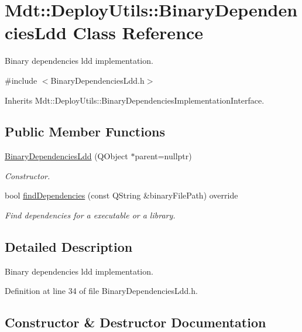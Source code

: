 \hypertarget{class_mdt_1_1_deploy_utils_1_1_binary_dependencies_ldd}{}\section{Mdt\+:\+:Deploy\+Utils\+:\+:Binary\+Dependencies\+Ldd Class Reference}
\label{class_mdt_1_1_deploy_utils_1_1_binary_dependencies_ldd}


Binary dependencies ldd implementation.  




{\ttfamily \#include $<$Binary\+Dependencies\+Ldd.\+h$>$}



Inherits Mdt\+::\+Deploy\+Utils\+::\+Binary\+Dependencies\+Implementation\+Interface.

\subsection*{Public Member Functions}
\begin{DoxyCompactItemize}
\item 
\hyperlink{class_mdt_1_1_deploy_utils_1_1_binary_dependencies_ldd_a2c033911e76b53cd89ecfcb4d91dcf10}{Binary\+Dependencies\+Ldd} (Q\+Object $\ast$parent=nullptr)
\begin{DoxyCompactList}\small\item\em Constructor. \end{DoxyCompactList}\item 
bool \hyperlink{class_mdt_1_1_deploy_utils_1_1_binary_dependencies_ldd_a2e707c35408525ee49a0084ed1ee0555}{find\+Dependencies} (const Q\+String \&binary\+File\+Path) override
\begin{DoxyCompactList}\small\item\em Find dependencies for a executable or a library. \end{DoxyCompactList}\end{DoxyCompactItemize}


\subsection{Detailed Description}
Binary dependencies ldd implementation. 

Definition at line 34 of file Binary\+Dependencies\+Ldd.\+h.



\subsection{Constructor \& Destructor Documentation}
